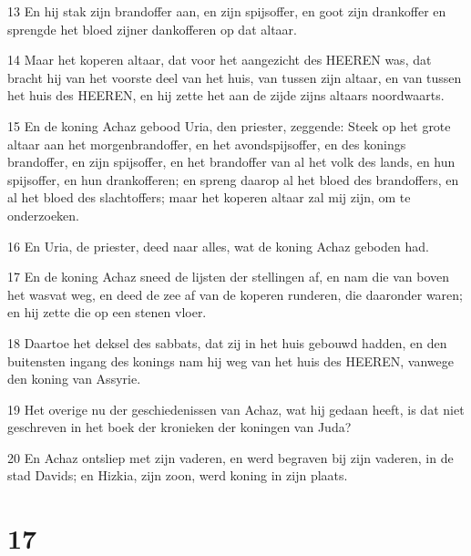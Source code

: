 \par 13 En hij stak zijn brandoffer aan, en zijn spijsoffer, en goot zijn drankoffer en sprengde het bloed zijner dankofferen op dat altaar.
\par 14 Maar het koperen altaar, dat voor het aangezicht des HEEREN was, dat bracht hij van het voorste deel van het huis, van tussen zijn altaar, en van tussen het huis des HEEREN, en hij zette het aan de zijde zijns altaars noordwaarts.
\par 15 En de koning Achaz gebood Uria, den priester, zeggende: Steek op het grote altaar aan het morgenbrandoffer, en het avondspijsoffer, en des konings brandoffer, en zijn spijsoffer, en het brandoffer van al het volk des lands, en hun spijsoffer, en hun drankofferen; en spreng daarop al het bloed des brandoffers, en al het bloed des slachtoffers; maar het koperen altaar zal mij zijn, om te onderzoeken.
\par 16 En Uria, de priester, deed naar alles, wat de koning Achaz geboden had.
\par 17 En de koning Achaz sneed de lijsten der stellingen af, en nam die van boven het wasvat weg, en deed de zee af van de koperen runderen, die daaronder waren; en hij zette die op een stenen vloer.
\par 18 Daartoe het deksel des sabbats, dat zij in het huis gebouwd hadden, en den buitensten ingang des konings nam hij weg van het huis des HEEREN, vanwege den koning van Assyrie.
\par 19 Het overige nu der geschiedenissen van Achaz, wat hij gedaan heeft, is dat niet geschreven in het boek der kronieken der koningen van Juda?
\par 20 En Achaz ontsliep met zijn vaderen, en werd begraven bij zijn vaderen, in de stad Davids; en Hizkia, zijn zoon, werd koning in zijn plaats.

\chapter{17}

